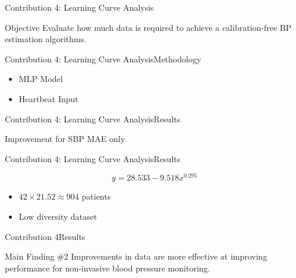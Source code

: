 \begin{frame}{Contribution 4: Learning Curve Analysis}
    \begin{block}{Objective}
        Evaluate how much data is required to achieve a calibration-free BP estimation algorithms.
    \end{block}
\end{frame}

\begin{frame}{Contribution 4: Learning Curve Analysis}{Methodology}
    \begin{figure}
        
    \end{figure}
    \begin{itemize}
        \item MLP Model
        \item Heartbeat Input
    \end{itemize}
\end{frame}

\begin{frame}{Contribution 4: Learning Curve Analysis}{Results}
    \begin{figure}[htbp]
        
        \hfill
        

        
        \hfill
        
    \end{figure}
    Improvement for SBP MAE only
\end{frame}


\begin{frame}{Contribution 4: Learning Curve Analysis}{Results}

    \begin{equation}\label{eq:fitted curve}
        y=\num{28.533} - \num{9.518} x^{\num{0.295}}
    \end{equation}
    \begin{figure}[htbp]
        
    \end{figure}

    \pause
    \begin{itemize}
        \item $42 \times 21.52 \approx 904$ patients
        \item Low diversity dataset
    \end{itemize}
\end{frame}

\begin{frame}{Contribution 4}{Results}
    \begin{block}{Main Finding \#2}
        Improvements in data are more effective at improving performance for non-invasive blood pressure monitoring.
    \end{block}
\end{frame}


